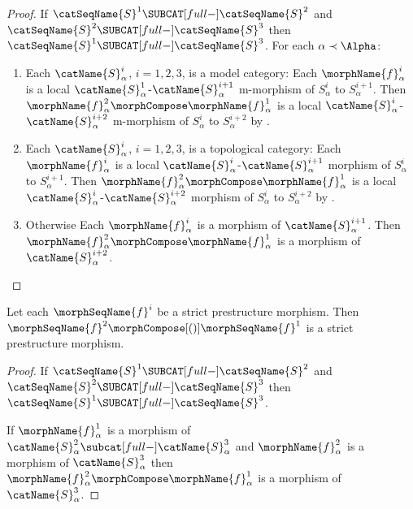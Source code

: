 \documentclass{article}
\begin{document}
\begin{lemma}
\begin{proof}
If $\catSeqName{S}^1 \SUBCAT[full-] \catSeqName{S}^2$ and
$\catSeqName{S}^2 \SUBCAT[full-] \catSeqName{S}^3$ then
$\catSeqName{S}^1 \SUBCAT[full-] \catSeqName{S}^3$.
For each $\alpha \prec \Alpha$:

\begin{enumerate}
\item Each $\catName{S}^i_\alpha$, $i=1,2,3$, is a model category:
\newline
Each $\morphName{f}^i_\alpha$ is a local
$\catName{S}^1_\alpha$-$\catName{S}^{i+1}_\alpha$ m-morphism of
$S^i_\alpha$ to $S^{i+1}_\alpha$.
Then $\morphName{f}^2_\alpha \morphCompose \morphName{f}^1_\alpha$ is a local
$\catName{S}^i_\alpha$-$\catName{S}^{i+2}_\alpha$ m-morphism of
$S^i_\alpha$ to $S^{i+2}_\alpha$ by
.

\item Each $\catName{S}^i_\alpha$, $i=1,2,3$, is a topological category:
\newline
Each $\morphName{f}^i_\alpha$ is a local
$\catName{S}^i_\alpha$-$\catName{S}^{i+1}_\alpha$ morphism of
$S^i_\alpha$ to $S^{i+1}_\alpha$.
Then $\morphName{f}^2_\alpha \morphCompose \morphName{f}^1_\alpha$ is a local
$\catName{S}^i_\alpha$-$\catName{S}^{i+2}_\alpha$ morphism of
$S^i_\alpha$ to $S^{i+2}_\alpha$ by .

\item Otherwise
\newline
Each $\morphName{f}^i_\alpha$ is a morphism of $\catName{S}^{i+1}_\alpha$.
Then $\morphName{f}^2_\alpha \morphCompose \morphName{f}^1_\alpha$ is a
morphism of $\catName{S}^{i+2}_\alpha$.
\end{enumerate}
\end{proof}

Let each $\morphSeqName{f}^i$ be a strict prestructure morphism. Then
$\morphSeqName{f}^2 \morphCompose[()] \morphSeqName{f}^1$ is a strict
prestructure morphism.

\begin{proof}
If $\catSeqName{S}^1 \SUBCAT[full-] \catSeqName{S}^2$ and
$\catSeqName{S}^2 \SUBCAT[full-] \catSeqName{S}^3$ then
$\catSeqName{S}^1 \SUBCAT[full-] \catSeqName{S}^3$.

If $\morphName{f}^1_\alpha$ is a morphism of
$\catName{S}^2_\alpha \subcat[full-] \catName{S}^3_\alpha$ and
$\morphName{f}^2_\alpha$ is a morphism of $\catName{S}^3_\alpha$ then
$\morphName{f}^2_\alpha \morphCompose \morphName{f}^1_\alpha$ is a morphism of
$\catName{S}^3_\alpha$.
\end{proof}


\end{lemma}
\end{document}

